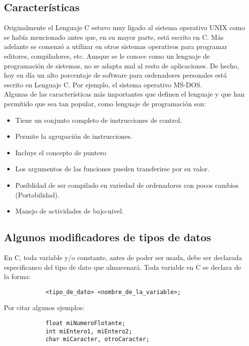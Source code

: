 \documentclass[letterpaper, 12pt]{article}
\begin{document}
        \newpage
        \subsection*{Características}
        Originalmente el Lenguaje C estuvo muy ligado al sistema operativo UNIX como se había mencionado antes que, en su mayor parte, está escrito en C. 
        Más adelante se comenzó a utilizar en otros sistemas operativos para programar editores, compiladores, etc. Aunque se le conoce como un lenguaje de programación de sistemas, 
        no se adapta mal al resto de aplicaciones. De hecho, hoy en día un alto porcentaje de software para ordenadores personales está escrito en Lenguaje C. Por ejemplo, el sistema operativo MS-DOS.\\
        Algunas de las características más importantes que definen el lenguaje y que han permitido que sea tan popular, como lenguaje de programación son: 
        \begin{itemize}
            \item Tiene un conjunto completo de instrucciones de control.
            \item Permite la agrupación de instrucciones.
            \item Incluye el concepto de puntero
            \item Los argumentos de las funciones pueden transferirse por su valor.
            \item Posiblidad de ser compilado en variedad de ordenadores con pocos cambios (Portabilidad).
            \item Manejo de actividades de bajo-nivel.
        \end{itemize}

        \subsection*{Algunos modificadores de tipos de datos}
        En C, toda variable y/o constante, antes de poder ser usada, debe ser declarada especificanco del tipo de dato que almacenará.
        Toda variable en C se declara de la forma:
        
        \begin{verbatim}
            <tipo_de_dato> <nombre_de_la_variable>;
        \end{verbatim}

        Por citar algunos ejemplos:

        \begin{verbatim}
            float miNumeroFlotante;
            int miEntero1, miEntero2;
            char miCaracter, otroCaracter;
        \end{verbatim}
\end{document}
